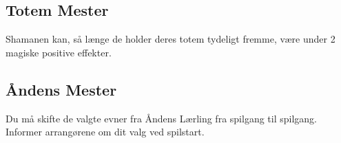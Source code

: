 \subsection*{Totem Mester} 
Shamanen kan, så længe de holder deres totem tydeligt fremme, være under 2 magiske positive effekter.

\subsection*{Åndens Mester} 
Du må skifte de valgte evner fra Åndens Lærling fra spilgang til spilgang. Informer arrangørene om dit valg ved spilstart.





